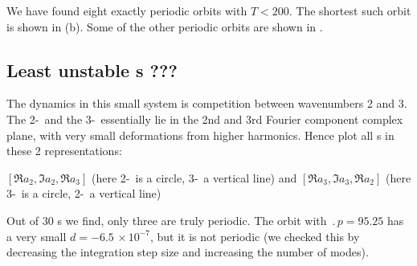 We have found eight exactly periodic orbits with $T < 200$.  The
shortest such orbit is shown in (b).  Some
of the other periodic orbits are shown in .


\subsection{Least unstable \rpo s ???}

The dynamics in this small system is competition between wavenumbers
2 and 3. The 2-\eqv\  and the 3-\eqv\  essentially lie in
the 2nd and 3rd Fourier component complex plane, with very
small deformations from higher harmonics.
Hence plot all \rpo s in these 2 representations:

$[ \Re a_2, \Im a_2, \Re a_3 ]$
(here 2-\eqv\  is a circle, 3-\eqv\ a vertical line)
 and
$[ \Re a_3, \Im a_3, \Re a_2 ]$
(here 3-\eqv\ is a circle, 2-\eqv\ a vertical line)

%
Out of 30 \rpo s we
find,  only three are truly periodic.  The orbit
with $\period{p} = 95.25$ has a very small
$d = -6.5\,\times 10^{-7}$, but it is not periodic
(we
checked this by decreasing the integration step size and increasing the
number of modes).


